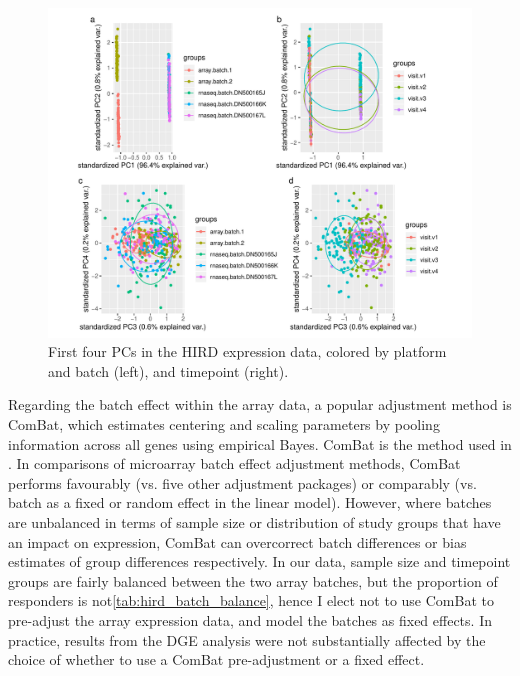 \begin{figure}
    \includegraphics[width=1.0\textwidth,page=1]{mainmatter/figures/chapter_02/compare_phenotype_by_platform.E_pca.pdf}
    \caption{First four \glspl{PC} in the \gls{HIRD} expression data, colored by platform and batch (left), and timepoint (right).}
    \label{fig:hird_expression_pcs}
\end{figure}

Regarding the batch effect within the array data, a popular adjustment method is ComBat\autocite{johnson2007AdjustingBatchEffects}, which estimates centering and scaling parameters by pooling information across all genes using empirical Bayes.
ComBat is the method used in \autocite{sobolev2016AdjuvantedInfluenzaH1N1Vaccination}.
In comparisons of microarray batch effect adjustment methods, ComBat performs favourably (vs. five other adjustment packages)\autocite{chen2011RemovingBatchEffects} or comparably (vs. batch as a fixed or random effect in the linear model)\autocite{espin-perez2018ComparisonStatisticalMethods}.
However, where batches are unbalanced in terms of sample size\autocite{zhang2018AlternativeEmpiricalBayes} or distribution of study groups that have an impact on expression\autocite{nygaard2015MethodsThatRemove}, ComBat can overcorrect batch differences or bias estimates of group differences respectively.
In our data, sample size and timepoint groups are fairly balanced between the two array batches, but the proportion of responders is not\cref{tab:hird_batch_balance}, hence I elect not to use ComBat to pre-adjust the array expression data, and model the batches as fixed effects.
In practice, results from the \gls{DGE} analysis were not substantially affected by the choice of whether to use a ComBat pre-adjustment or a fixed effect.


